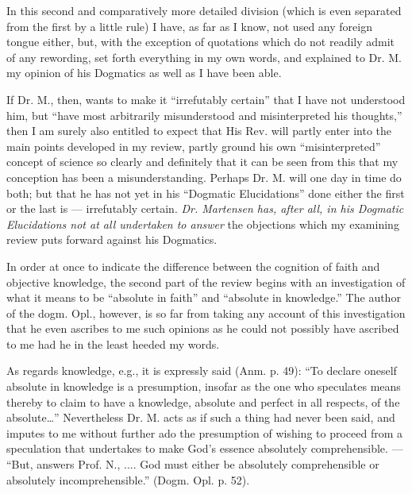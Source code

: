 \documentclass[12pt,a4paper,openany]{book}
\newcommand{\opage}[1]{\marginnote{\footnotesize\textit{[#1]}}}
\begin{document}
In this second and comparatively more detailed division (which
is even separated from the first by a little rule) I have,
as far as I know, not used any foreign
tongue either, but, with the exception of quotations which do not
readily admit
\setcounter{footnote}{0}%
\opage{48}of any rewording, set forth everything in my own words, and
explained to Dr. M. my opinion of his Dogmatics as well as
I have been able.

If Dr. M., then, wants to make it ``irrefutably certain'' that I
have not understood him, but ``have most arbitrarily misunderstood
and misinterpreted his thoughts,'' then I am surely also entitled
to expect that His Rev. will partly enter into
the main points developed in my review, partly ground
his own ``misinterpreted'' concept of science so clearly and definitely
that it can be seen from this that my conception has been a misunderstanding.
Perhaps Dr. M. will one day in time do both;
but that he has not yet in his ``Dogmatic Elucidations''
done either the first or the last is --- irrefutably
certain.
\emph{Dr. Martensen has, after all, in his Dogmatic Elucidations not at all undertaken to answer}
the objections which my examining review
puts forward against his Dogmatics.

In order at once to indicate the difference between the cognition of faith
and objective knowledge, the second part of the review
begins with an investigation of what it means to be
``absolute in faith'' and ``absolute in knowledge.'' The author of the
dogm. Opl., however, is so far from taking any account
of this investigation that he even ascribes to me such
opinions as he could not possibly have ascribed to me
had he in the least heeded my words.

As regards knowledge, e.g., it is expressly said
(Anm. p. 49): ``To declare oneself absolute in knowledge is a presumption,
insofar as the one who speculates means thereby to claim to
have a knowledge, absolute and perfect in all respects, of
\setcounter{footnote}{0}%
\opage{49}the absolute\dots{}'' Nevertheless Dr. M. acts as if
such a thing had never been said, and imputes to me without further ado the
presumption of wishing to proceed from a speculation that undertakes
to make God's essence absolutely comprehensible. --- ``But,
answers Prof. N., .... God must either be absolutely comprehensible
or absolutely incomprehensible.'' (Dogm. Opl. p. 52).
\end{document}
